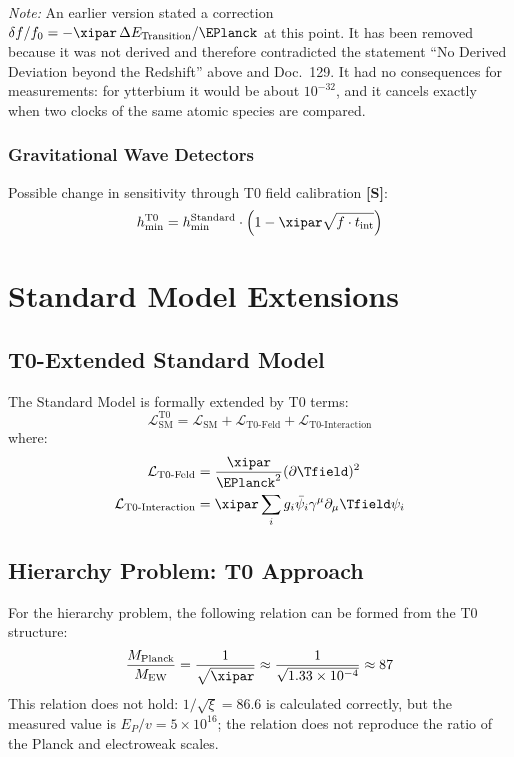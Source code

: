 	\textit{Note:} An earlier version stated a correction $\delta f/f_0 = -\xipar\,\Delta E_{\text{Transition}}/\EPlanck$ at this point. It has been removed because it was not derived and therefore contradicted the statement ``No Derived Deviation beyond the Redshift'' above and Doc.~129. It had no consequences for measurements: for ytterbium it would be about $10^{-32}$, and it cancels exactly when two clocks of the same atomic species are compared.
	\subsubsection{Gravitational Wave Detectors}
	Possible change in sensitivity through T0 field calibration \textbf{[S]}:
	\begin{equation}
		h_{\text{min}}^{\text{T0}} = h_{\text{min}}^{\text{Standard}} \cdot \left(1 - \xipar \sqrt{f \cdot t_{\text{int}}}\right)
	\end{equation}
	\section{Standard Model Extensions}
	\subsection{T0-Extended Standard Model}
	The Standard Model is formally extended by T0 terms:
	\begin{equation}
		\mathcal{L}_{\text{SM}}^{\text{T0}} = \mathcal{L}_{\text{SM}} + \mathcal{L}_{\text{T0-Feld}} + \mathcal{L}_{\text{T0-Interaction}}
	\end{equation}
	where:
	\begin{align}
		\mathcal{L}_{\text{T0-Feld}} &= \frac{\xipar}{\EPlanck^2} (\partial \Tfield)^2 \\
		\mathcal{L}_{\text{T0-Interaction}} &= \xipar \sum_i g_i \bar{\psi}_i \gamma^\mu \partial_\mu \Tfield \psi_i
	\end{align}
	\subsection{Hierarchy Problem: T0 Approach}
	For the hierarchy problem, the following relation can be formed from the T0 structure:
	\begin{equation}
		\frac{M_{\text{Planck}}}{M_{\text{EW}}} = \frac{1}{\sqrt{\xipar}} \approx \frac{1}{\sqrt{1.33 \times 10^{-4}}} \approx 87
	\end{equation}
	This relation does not hold: $1/\sqrt{\xi} = 86.6$ is calculated correctly, but the measured value is $E_P/v = 5 \times 10^{16}$; the relation does not reproduce the ratio of the Planck and electroweak scales.

